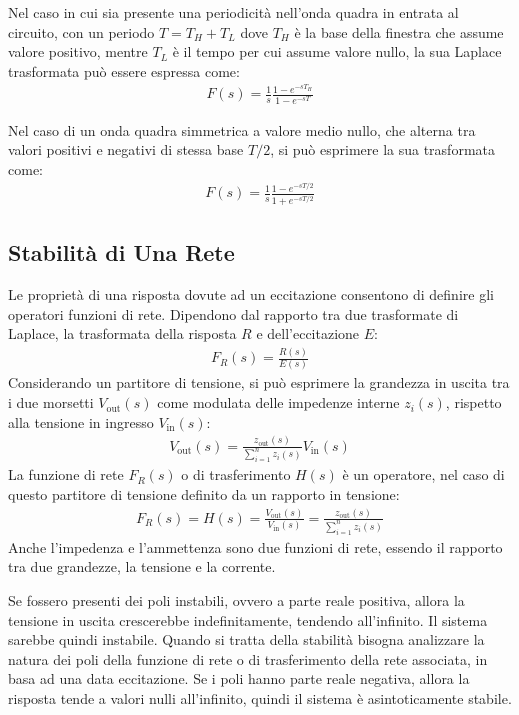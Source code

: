 \documentclass{article}
\numberwithin{equation}{subsection}
\begin{document}
Nel caso in cui sia presente una periodicità nell'onda quadra in entrata al circuito, con un periodo $T=T_H+T_L$ dove $T_H$ è la base della finestra che assume valore positivo, 
mentre $T_L$ è il tempo per cui assume valore nullo, la sua Laplace trasformata può essere espressa come:
\begin{gather*}
    F(s)=\displaystyle\frac{1}{s}\frac{1-e^{-sT_H}}{1-e^{-sT}}
\end{gather*}

Nel caso di un onda quadra simmetrica a valore medio nullo, che alterna tra valori positivi e negativi di stessa base $T/2$, si può esprimere la sua trasformata come:
\begin{gather*}
    F(s)=\displaystyle\frac{1}{s}\frac{1-e^{-sT/2}}{1+e^{-sT/2}}
\end{gather*}

\subsection{Stabilità di Una Rete}

Le proprietà di una risposta dovute ad un eccitazione consentono di definire gli operatori funzioni di rete. Dipendono dal rapporto tra due 
trasformate di Laplace, la trasformata della risposta $R$ e dell'eccitazione $E$:
\begin{gather}
    F_R(s)=\displaystyle\frac{R(s)}{E(s)}
\end{gather}
Considerando un partitore di tensione, si può esprimere la grandezza in uscita tra i due morsetti $V_\mathrm{out}(s)$ come modulata delle impedenze interne $z_i(s)$, 
rispetto alla tensione in ingresso $V_\mathrm{in}(s)$:
\begin{gather*}
    \displaystyle V_\mathrm{out}(s)=\frac{z_\mathrm{out}(s)}{\sum_{i=1}^nz_i(s)}V_\mathrm{in}(s)
\end{gather*}
La funzione di rete $F_R(s)$ o di trasferimento $H(s)$ è un operatore, nel caso di questo partitore di tensione definito da un rapporto in tensione:
\begin{gather*}
    F_R(s)=H(s)=\displaystyle\frac{V_\mathrm{out}(s)}{V_\mathrm{in}(s)}=\frac{z_\mathrm{out}(s)}{\sum_{i=1}^nz_i(s)}
\end{gather*}
Anche l'impedenza e l'ammettenza sono due funzioni di rete, essendo il rapporto tra due grandezze, la tensione e la corrente. 

Se fossero presenti dei poli instabili, ovvero a parte reale positiva, allora la tensione in uscita crescerebbe indefinitamente, tendendo all'infinito. Il sistema sarebbe 
quindi instabile. 
Quando si tratta della stabilità bisogna analizzare la natura dei poli della funzione di rete o di trasferimento della rete associata, in basa ad una data eccitazione. 
Se i poli hanno parte reale negativa, allora la risposta tende a valori nulli all'infinito, quindi il sistema è asintoticamente stabile. 
\end{document}
